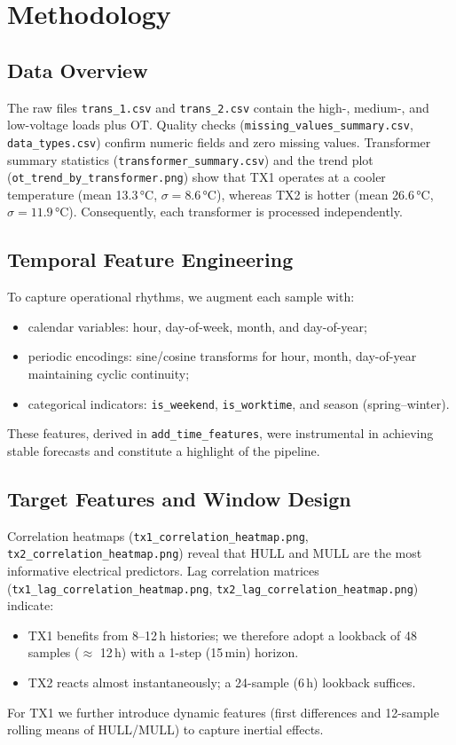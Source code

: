 \documentclass[11pt]{article}
\begin{document}
\section{Methodology}
\subsection{Data Overview}
The raw files \texttt{trans\_1.csv} and \texttt{trans\_2.csv} contain the high-, medium-, and low-voltage loads plus OT. Quality checks (\texttt{missing\_values\_summary.csv}, \texttt{data\_types.csv}) confirm numeric fields and zero missing values. Transformer summary statistics (\texttt{transformer\_summary.csv}) and the trend plot (\texttt{ot\_trend\_by\_transformer.png}) show that TX1 operates at a cooler temperature (mean 13.3\,°C, $\sigma = 8.6$\,°C), whereas TX2 is hotter (mean 26.6\,°C, $\sigma = 11.9$\,°C). Consequently, each transformer is processed independently.

\subsection{Temporal Feature Engineering}
To capture operational rhythms, we augment each sample with:
\begin{itemize}
    \item calendar variables: hour, day-of-week, month, and day-of-year;
    \item periodic encodings: sine/cosine transforms for hour, month, day-of-year maintaining cyclic continuity;
    \item categorical indicators: \texttt{is\_weekend}, \texttt{is\_worktime}, and season (spring--winter).
\end{itemize}
These features, derived in \texttt{add\_time\_features}, were instrumental in achieving stable forecasts and constitute a highlight of the pipeline.

\subsection{Target Features and Window Design}
Correlation heatmaps (\texttt{tx1\_correlation\_heatmap.png}, \texttt{tx2\_correlation\_heatmap.png}) reveal that HULL and MULL are the most informative electrical predictors. Lag correlation matrices (\texttt{tx1\_lag\_correlation\_heatmap.png}, \texttt{tx2\_lag\_correlation\_heatmap.png}) indicate:
\begin{itemize}
    \item TX1 benefits from 8--12\,h histories; we therefore adopt a lookback of 48 samples ($\approx$ 12\,h) with a 1-step (15\,min) horizon.
    \item TX2 reacts almost instantaneously; a 24-sample (6\,h) lookback suffices.
\end{itemize}
For TX1 we further introduce dynamic features (first differences and 12-sample rolling means of HULL/MULL) to capture inertial effects.
\end{document}
